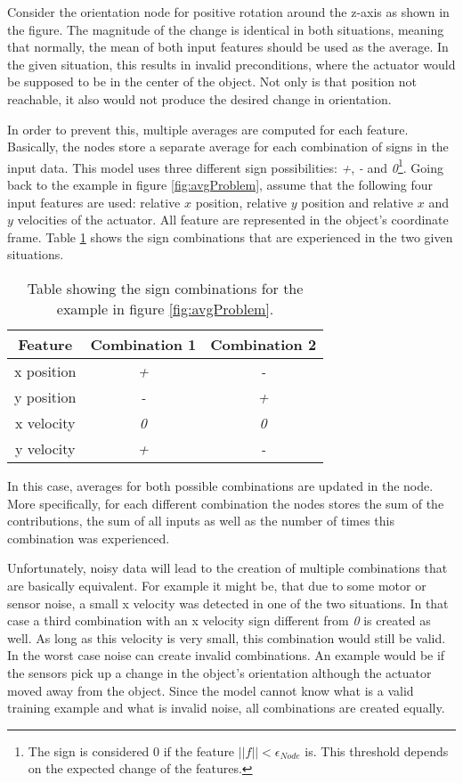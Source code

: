 Consider the orientation node for positive rotation around the z-axis as shown in the figure. The magnitude of the change is identical in both situations, meaning that normally, the mean of both input features should be used as the average. In the given situation, this results in invalid preconditions, where the actuator would be supposed to be in the center of the object. Not only is that position not reachable, it also would not produce the desired change in orientation. 

In order to prevent this, multiple averages are computed for each feature. Basically, the nodes store a separate average for each combination of signs in the input data. This model uses three different sign possibilities: \textit{+}, \textit{-} and \textit{0}\footnote{The sign is considered 0 if the feature $||f|| < \epsilon_{Node}$ is. This threshold depends on the expected change of the features.}.
Going back to the example in figure \ref{fig:avgProblem}, assume that the following four input features are used: relative $x$ position, relative $y$ position and relative $x$ and $y$ velocities of the actuator. All feature are represented in the object's coordinate frame. Table \ref{tab:signCombinations} shows the sign combinations that are experienced in the two given situations. 

\begin{table}
	\centering
	\begin{tabular}{|c|c|c|}
		\hline Feature & Combination 1 & Combination 2 \\ 
		\hline x position & \textit{+} & \textit{-} \\ 
		\hline y position & \textit{-} & \textit{+} \\ 
		\hline x velocity & \textit{0} & \textit{0} \\
		\hline y velocity & \textit{+} & \textit{-} \\ 
		\hline 
	\end{tabular} 
	\caption{Table showing the sign combinations for the example in figure \ref{fig:avgProblem}.}
	\label{tab:signCombinations}
\end{table}

In this case, averages for both possible combinations are updated in the node. More specifically, for each different combination the nodes stores the sum of the contributions, the sum of all inputs as well as the number of times this combination was experienced. 

Unfortunately, noisy data will lead to the creation of multiple combinations that are basically equivalent. For example it might be, that due to some motor or sensor noise, a small x velocity was detected in one of the two situations. In that case a third combination with an x velocity sign different from \textit{0} is created as well. As long as this velocity is very small, this combination would still be valid. In the worst case noise can create invalid combinations. An example would be if the sensors pick up a change in the object's orientation although the actuator moved away from the object. Since the model cannot know what is a valid training example and what is invalid noise, all combinations are created equally.

